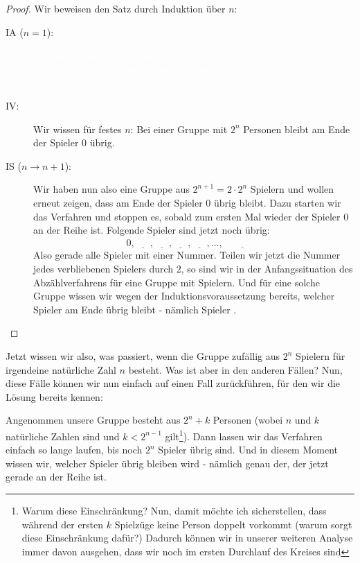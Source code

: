 \documentclass[a4paper,ngerman,12pt]{scrartcl}
\theoremstyle{definition}
\theoremstyle{plain}
\theoremstyle{remark}
\begin{document}
\begin{proof}
	Wir beweisen den Satz durch Induktion über $n$:
	\begin{description}
		\item[IA ($n=1$):] \textcolor{white}{Bei einer Gruppengröße von $2^1=2$ Personen ist lediglich ein einziger Spielzug notwendig: Spieler $0$ beginnt, indem er Spieler $1$ antippt. Dieser scheidet aus, wodurch Spieler $0$ als letzter Spieler übrig bleibt.}
		\item[IV:] Wir wissen für festes $n$: Bei einer Gruppe mit $2^n$ Personen bleibt am Ende der Spieler $0$ übrig.
		\item[IS ($n\to n+1$):] Wir haben nun also eine Gruppe aus $2^{n+1} = 2\cdot 2^n$ Spielern und wollen erneut zeigen, dass am Ende der Spieler $0$ übrig bleibt. Dazu starten wir das Verfahren und stoppen es, sobald zum ersten Mal wieder der Spieler $0$ an der Reihe ist. Folgende Spieler sind jetzt noch übrig:
			\[0, \underline{\phantom{2\quad}}, \underline{\phantom{4\quad}}, \underline{\phantom{6\quad}}, \underline{\phantom{8\quad}}, \dots , \underline{\phantom{ 2^{n+1}-2 }}\]
		Also gerade alle Spieler mit einer \underline{\phantom{ geraden\quad }} Nummer. Teilen wir jetzt die Nummer jedes verbliebenen Spielers durch $2$, so sind wir in der Anfangssituation des Abzählverfahrens für eine Gruppe mit \underline{\phantom{$2^n$\quad}} Spielern. Und für eine solche Gruppe wissen wir wegen der Induktionsvoraussetzung bereits, welcher Spieler am Ende übrig bleibt - nämlich Spieler \underline{\phantom{$0$\quad}}. \qedhere
	\end{description}
\end{proof}

Jetzt wissen wir also, was passiert, wenn die Gruppe zufällig aus $2^n$ Spielern für irgendeine natürliche Zahl $n$ besteht. Was ist aber in den anderen Fällen? Nun, diese Fälle können wir nun einfach auf einen Fall zurückführen, für den wir die Lösung bereits kennen:

Angenommen unsere Gruppe besteht aus $2^n + k$ Personen (wobei $n$ und $k$ natürliche Zahlen sind und $k < 2^{n-1}$ gilt\footnote{Warum diese Einschränkung? Nun, damit möchte ich sicherstellen, dass während der ersten $k$ Spielzüge keine Person doppelt vorkommt (warum sorgt diese Einschränkung dafür?) Dadurch können wir in unserer weiteren Analyse immer davon ausgehen, dass wir noch im ersten Durchlauf des Kreises sind}). Dann lassen wir das Verfahren einfach so lange laufen, bis noch $2^n$ Spieler übrig sind. Und in diesem Moment wissen wir, welcher Spieler übrig bleiben wird - nämlich genau der, der jetzt gerade an der Reihe ist.
\end{document}
